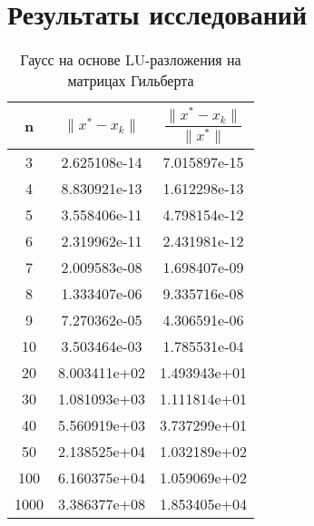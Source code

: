 \documentclass[a4paper,12pt]{article}
\begin{document}
\section{Результаты исследований}

\clearpage

\begin{table}[]
\centering
\caption{Гаусс на основе LU-разложения на матрицах Гильберта}
\begin{tabular}{|c|c|c|}
\hline
\rowcolor[HTML]{C9FB98} 
n     & $\|x^* - x_k\|$            & $\dfrac{\|x^* - x_k\|}{\|x^*\|}$           \\ \hline
\rowcolor[HTML]{EEFB98} 
3    & 2.625108e-14                                              & 7.015897e-15 \\ \hline
\rowcolor[HTML]{EEFB98} 
4    & 8.830921e-13                                              & 1.612298e-13 \\ \hline
\rowcolor[HTML]{EEFB98} 
5    & 3.558406e-11                                              & 4.798154e-12 \\ \hline
\rowcolor[HTML]{EEFB98} 
6    & 2.319962e-11                                              & 2.431981e-12 \\ \hline
\rowcolor[HTML]{EEFB98} 
7    & 2.009583e-08                                              & 1.698407e-09 \\ \hline
\rowcolor[HTML]{EEFB98} 
8    & 1.333407e-06                                              & 9.335716e-08 \\ \hline
\rowcolor[HTML]{EEFB98} 
9    & 7.270362e-05                                              & 4.306591e-06 \\ \hline
\rowcolor[HTML]{EEFB98} 
10   & 3.503464e-03                                              & 1.785531e-04 \\ \hline
\rowcolor[HTML]{EEFB98} 
20   & 8.003411e+02                                              & 1.493943e+01 \\ \hline
\rowcolor[HTML]{EEFB98} 
30   & 1.081093e+03                                              & 1.111814e+01 \\ \hline
\rowcolor[HTML]{EEFB98} 
40   & 5.560919e+03                                              & 3.737299e+01 \\ \hline
\rowcolor[HTML]{EEFB98} 
50   & 2.138525e+04                                              & 1.032189e+02 \\ \hline
\rowcolor[HTML]{EEFB98} 
100  & 6.160375e+04                                              & 1.059069e+02 \\ \hline
\rowcolor[HTML]{EEFB98} 
1000 & 3.386377e+08                                              & 1.853405e+04 \\ \hline
\end{tabular}
\end{table}
\end{document}
